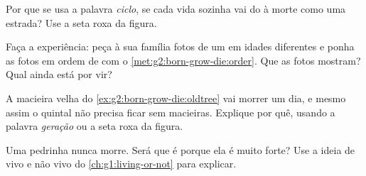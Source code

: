 \begin{exercise}[$\star$]\label{exo:g2:born-grow-die:7}
Por que se usa a palavra \emph{ciclo}, se cada vida sozinha vai do
 à morte como uma estrada? Use a seta roxa da figura.
\end{exercise}

\begin{exercise}[$\star$]\label{exo:g2:born-grow-die:8}
Faça a experiência: peça à sua família fotos de um  em idades
diferentes e ponha as fotos em ordem de  com o
\cref{met:g2:born-grow-die:order}. Que  as fotos mostram? Qual
 ainda está por vir?
\end{exercise}

\begin{exercise}[$\star\star$]\label{exo:g2:born-grow-die:9}
A macieira velha do \cref{ex:g2:born-grow-die:oldtree} vai morrer um
dia, e mesmo assim o quintal não precisa ficar sem macieiras.
Explique por quê, usando a palavra \emph{geração} ou a seta roxa da
figura.
\end{exercise}

\begin{exercise}[$\star\star$]\label{exo:g2:born-grow-die:10}
Uma pedrinha nunca morre. Será que é porque ela é muito forte? Use a
ideia de vivo e não vivo do \cref{ch:g1:living-or-not} para explicar.
\end{exercise}
